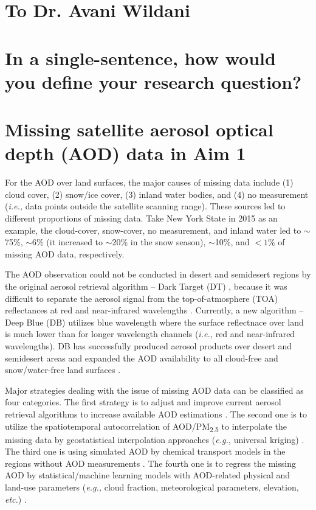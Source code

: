 \documentclass[11pt]{article}
\newcommand{\tsub}{\textsubscript}
\begin{document}
\section*{To Dr. Avani Wildani}
\setcounter{section}{0}

\section{In a single-sentence, how would you define your research question?}

\section{Missing satellite aerosol optical depth (AOD) data in Aim 1}
\begin{enumerate*}[{[a)]}]
    \item For the AOD over land surfaces, the major causes of missing data include (1) cloud cover, (2) snow/ice cover, (3) inland water bodies, and (4) no measurement (\textit{i.e.,} data points outside the satellite scanning range). These sources led to different proportions of missing data. Take New York State in 2015 as an example, the cloud-cover, snow-cover, no measurement, and inland water led to $\sim$75\%, $\sim$6\% (it increased to $\sim$20\% in the snow season), $\sim$10\%, and $< 1\%$ of missing AOD data, respectively. 
    
    The AOD observation could not be conducted in desert and semidesert regions by the original aerosol retrieval algorithm -- Dark Target (DT) \citep{kaufman1997modis, levy2007second}, because it was difficult to separate the aerosol signal from the top-of-atmosphere (TOA) reflectances at red and near-infrared wavelengths \citep{hsu2013enhanced}. Currently, a new algorithm -- Deep Blue (DB) \citep{hsu2004aerosol} utilizes blue wavelength where the surface reflectnace over land is much lower than for longer wavelength channels (\textit{i.e.,} red and near-infrared wavelengths). DB has successfully produced aerosol products over desert and semidesert areas and expanded the AOD availability to all cloud-free and snow/water-free land surfaces \citep{hsu2013enhanced}. 
    
    Major strategies dealing with the issue of missing AOD data can be classified as four categories. The first strategy is to adjust and improve current aerosol retrieval algorithms to increase available AOD estimations \citep{van2011satellite}. The second one is to utilize the spatiotemporal autocorrelation of AOD/PM\tsub{2.5} to interpolate the missing data by geostatistical interpolation approaches (\textit{e.g.,} universal kriging) \citep{kloog2011assessing, kloog2012incorporating}. The third one is using simulated AOD by chemical transport models in the regions without AOD measurements \citep{hu2017estimating}. The fourth one is to regress the missing AOD by statistical/machine learning models with AOD-related physical and land-use parameters (\textit{e.g.,} cloud fraction, meteorological parameters, elevation, \textit{etc.}) \citep{xiao2017full}.
    

\end{enumerate*}
\end{document}
